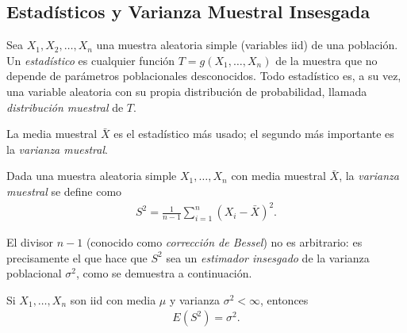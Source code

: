 \subsection{Estad\'isticos y Varianza Muestral Insesgada}

\begin{definicion}
Sea $X_1, X_2, \ldots, X_n$ una muestra aleatoria simple (variables iid) de una
poblaci\'on. Un \emph{estad\'istico} es cualquier funci\'on $T = g(X_1, \ldots, X_n)$
de la muestra que no depende de par\'ametros poblacionales desconocidos. Todo
estad\'istico es, a su vez, una variable aleatoria con su propia distribuci\'on de
probabilidad, llamada \emph{distribuci\'on muestral} de $T$.
\end{definicion}

La media muestral $\bar{X}$ es el estad\'istico m\'as usado; el segundo m\'as
importante es la \emph{varianza muestral}.

\begin{definicion}
 \label{eq:5.1.1}
Dada una muestra aleatoria simple $X_1, \ldots, X_n$ con media muestral $\bar{X}$, la
\emph{varianza muestral} se define como
\begin{align}
 S^2 = \frac{1}{n-1}\sum_{i=1}^n (X_i - \bar{X})^2.
\end{align}
\end{definicion}

\begin{observacion}
El divisor $n-1$ (conocido como \emph{correcci\'on de Bessel}) no es arbitrario: es
precisamente el que hace que $S^2$ sea un \emph{estimador insesgado} de la varianza
poblacional $\sigma^2$, como se demuestra a continuaci\'on.
\end{observacion}

\begin{teorema}
 \label{eq:5.1.2}
Si $X_1, \ldots, X_n$ son iid con media $\mu$ y varianza $\sigma^2 < \infty$, entonces
\begin{align}
 E(S^2) = \sigma^2.
\end{align}
\end{teorema}

